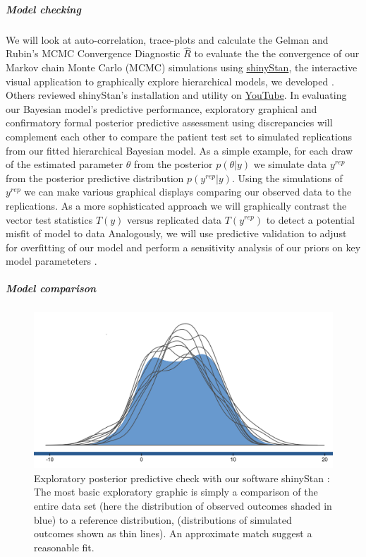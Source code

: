 \documentclass[11pt,notitlepage]{article}
\begin{document}
\subparagraph*{Model checking}
We will look at auto-correlation, trace-plots and calculate the Gelman and Rubin's MCMC Convergence Diagnostic $ \hat{R}$ to evaluate the the convergence of our Markov chain Monte Carlo (MCMC) simulations using \href{http://andrewgelman.com/2015/03/02/introducing-shinystan/}{shinyStan}, the interactive visual application to graphically explore hierarchical models, we developed \cite{shinystan-software:2015}. Others reviewed shinyStan's installation and utility on \href{https://www.youtube.com/watch?v=X31xqNHcvQs}{YouTube}. In evaluating our Bayesian model's predictive performance, exploratory graphical \cite{Gelman2004posteriorpredictivechecks} and confirmatory formal posterior predictive assessment using discrepancies \cite{GelmanMengStern1996} will complement each other to compare the patient test set to simulated replications from our fitted hierarchical Bayesian model. As a simple example, for each draw of the estimated parameter $\theta$ from the posterior $p(\theta|y)$ we simulate data $y^{rep}$ from the posterior predictive distribution $ p(y^{rep}|y) $. Using the simulations of $y^{rep}$ we can make various graphical displays comparing our observed data to the replications. As a more sophisticated approach we will graphically contrast the vector test statistics $T(y)$ versus replicated data $T(y^{rep})$ to detect a potential misfit of model to data \cite{Gelman2004posteriorpredictivechecks,Buja1999inference} Analogously, we will use predictive validation to adjust for overfitting of our model and perform a sensitivity analysis of our priors on key model parameteters \cite{Gelman-Hill_2014,Gelman_predictive_2000}.

\subparagraph*{Model comparison}

\begin{figure} 
 \vspace{-15pt}
 \includegraphics[scale=0.2]{Figures/posteriorpredictivecheck.png} 
  \caption{\footnotesize Exploratory posterior predictive check with our software shinyStan \cite{shinystan-software:2015}: The most basic exploratory graphic \cite{Gelman2004posteriorpredictivechecks} is simply a comparison of the entire data set (here the distribution of observed outcomes shaded in blue) to a reference distribution, (distributions of simulated outcomes shown as thin lines). An approximate match suggest a reasonable fit.}
  \label{fig:posteriorpredictivecheck}
  \vspace{-10pt}
\end{figure}
\end{document}
